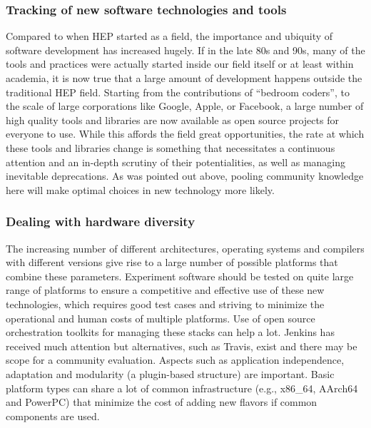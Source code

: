 \documentclass[12pt,a4paper]{article}
\begin{document}
\hypertarget{tracking-of-new-software-technologies-and-tools}{%
\subsubsection{Tracking of new software technologies and
tools}\label{tracking-of-new-software-technologies-and-tools}}

Compared to when HEP started as a field, the importance and ubiquity of
software development has increased hugely. If in the late 80s and 90s,
many of the tools and practices were actually started inside our field
itself or at least within academia, it is now true that a large amount
of development happens outside the traditional HEP field. Starting from
the contributions of ``bedroom coders'', to the scale of large
corporations like Google, Apple, or Facebook, a large number of high
quality tools and libraries are now available as open source projects
for everyone to use. While this affords the field great opportunities,
the rate at which these tools and libraries change is something that
necessitates a continuous attention and an in-depth scrutiny of their
potentialities, as well as managing inevitable deprecations. As was
pointed out above, pooling community knowledge here will make optimal
choices in new technology more likely.

\hypertarget{dealing-with-hardware-diversity}{%
\subsubsection{Dealing with hardware
diversity}\label{dealing-with-hardware-diversity}}

The increasing number of different architectures, operating systems and
compilers with different versions give rise to a large number of
possible platforms that combine these parameters. Experiment software
should be tested on quite large range of platforms to ensure a
competitive and effective use of these new technologies, which requires
good test cases and striving to minimize the operational and human costs
of multiple platforms. Use of open source orchestration toolkits for
managing these stacks can help a lot. Jenkins has received much
attention but alternatives, such as Travis, exist and there may be scope
for a community evaluation. Aspects such as application independence,
adaptation and modularity (a plugin-based structure) are important.
Basic platform types can share a lot of common infrastructure (e.g.,
x86\_64, AArch64 and PowerPC) that minimize the cost of adding new
flavors if common components are used.
\end{document}
